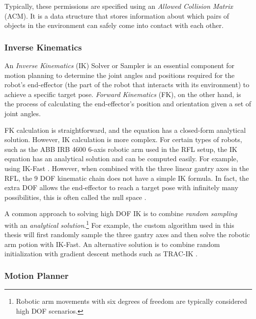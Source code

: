 Typically, these permissions are specified using an \textit{Allowed Collision Matrix} (ACM). It is a data structure that stores information about which pairs of objects in the environment can safely come into contact with each other.

\subsubsection{Inverse Kinematics}
\label{subsubsection:exploration-2-inverse-kinematics}

An \textit{Inverse Kinematics} (IK) Solver or Sampler is an essential component for motion planning to determine the joint angles and positions required for the robot's end-effector (the part of the robot that interacts with its environment) to achieve a specific target pose. \textit{Forward Kinematics} (FK), on the other hand, is the process of calculating the end-effector's position and orientation given a set of joint angles.

FK calculation is straightforward, and the equation has a closed-form analytical solution. However, IK calculation is more complex. For certain types of robots, such as the ABB IRB 4600 6-axis robotic arm used in the RFL setup, the IK equation has an analytical solution and can be computed easily. For example, using IK-Fast \parencite{diankovOpenRAVEPlanningArchitecture2008}. However, when combined with the three linear gantry axes in the RFL, the 9 DOF kinematic chain does not have a simple IK formula. In fact, the extra DOF allows the end-effector to reach a target pose with infinitely many possibilities, this is often called the null space \parencite{craigIntroductionRobotics2017}.

A common approach to solving high DOF IK is to combine \textit{random sampling} with an \textit{analytical solution}.\footnote{Robotic arm movements with six degrees of freedom are typically considered high DOF scenarios.} For example, the custom algorithm used in this thesis will first randomly sample the three gantry axes and then solve the robotic arm potion with IK-Fast. An alternative solution is to combine random initialization with gradient descent methods such as TRAC-IK \parencite{beesonTRACIKOpensourceLibrary2015}. 

\subsubsection{Motion Planner}
\label{subsubsection:exploration-2-motion-planner}

